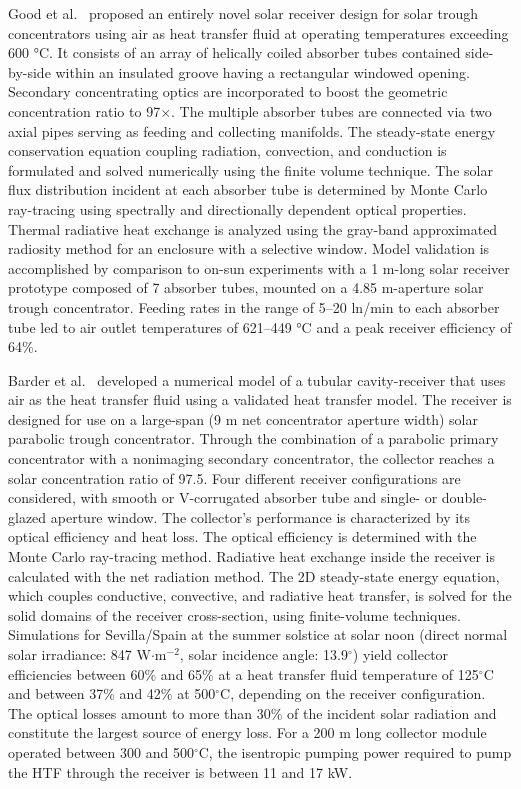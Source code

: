 Good et al.~\cite{Good2015} proposed an entirely novel solar receiver design for solar trough concentrators using air as heat transfer fluid at operating temperatures exceeding 600 °C. It consists of an array of helically coiled absorber tubes contained side-by-side within an insulated groove having a rectangular windowed opening. Secondary concentrating optics are incorporated to boost the geometric concentration ratio to 97×. The multiple absorber tubes are connected via two axial pipes serving as feeding and collecting manifolds. The steady-state energy conservation equation coupling radiation, convection, and conduction is formulated and solved numerically using the finite volume technique. The solar flux distribution incident at each absorber tube is determined by Monte Carlo ray-tracing using spectrally and directionally dependent optical properties. Thermal radiative heat exchange is analyzed using the gray-band approximated radiosity method for an enclosure with a selective window. Model validation is accomplished by comparison to on-sun experiments with a 1 m-long solar receiver prototype composed of 7 absorber tubes, mounted on a 4.85 m-aperture solar trough concentrator. Feeding rates in the range of 5–20 ln/min to each absorber tube led to air outlet temperatures of 621–449 °C and a peak receiver efficiency of 64\%.

Barder et al.~\cite{Bader2015} developed a numerical model of a tubular cavity-receiver that uses air as the heat transfer fluid using a validated heat transfer model. The receiver is designed for use on a large-span (9 m net concentrator aperture width) solar parabolic trough concentrator. Through the combination of a parabolic primary concentrator with a nonimaging secondary concentrator, the collector reaches a solar concentration ratio of 97.5. Four different receiver configurations are considered, with smooth or V-corrugated absorber tube and single- or double-glazed aperture window. The collector's performance is characterized by its optical efficiency and heat loss. The optical efficiency is determined with the Monte Carlo ray-tracing method. Radiative heat exchange inside the receiver is calculated with the net radiation method. The 2D steady-state energy equation, which couples conductive, convective, and radiative heat transfer, is solved for the solid domains of the receiver cross-section, using finite-volume techniques. Simulations for Sevilla/Spain at the summer solstice at solar noon (direct normal solar irradiance: 847 W$\cdot$m$^{-2}$, solar incidence angle: 13.9$^\circ$) yield collector efficiencies between 60\% and 65\% at a heat transfer fluid temperature of 125$^\circ$C and between 37\% and 42\% at 500$^\circ$C, depending on the receiver configuration. The optical losses amount to more than 30\% of the incident solar radiation and constitute the largest source of energy loss. For a 200 m long collector module operated between 300 and 500$^\circ$C, the isentropic pumping power required to pump the HTF through the receiver is between 11 and 17 kW.

